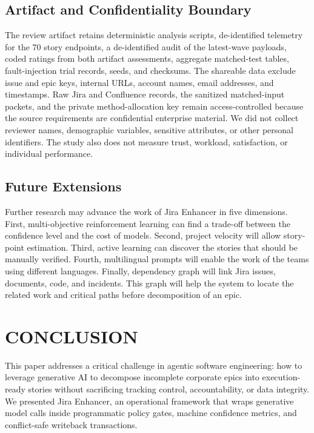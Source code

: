 \documentclass[manuscript,review]{acmart}
\begin{document}
\subsection{Artifact and Confidentiality Boundary}\label{sec:artifact-access}

The review artifact retains deterministic analysis scripts, de-identified telemetry for the 70 story endpoints, a de-identified audit of the latest-wave payloads, coded ratings from both artifact assessments, aggregate matched-test tables, fault-injection trial records, seeds, and checksums. The shareable data exclude issue and epic keys, internal URLs, account names, email addresses, and timestamps. Raw Jira and Confluence records, the sanitized matched-input packets, and the private method-allocation key remain access-controlled because the source requirements are confidential enterprise material. We did not collect reviewer names, demographic variables, sensitive attributes, or other personal identifiers. The study also does not measure trust, workload, satisfaction, or individual performance.

\subsection{Future Extensions}

Further research may advance the work of Jira Enhancer in five dimensions. First, multi-objective reinforcement learning can find a trade-off between the confidence level and the cost of models. Second, project velocity will allow story-point estimation. Third, active learning can discover the stories that should be manually verified. Fourth, multilingual prompts will enable the work of the teams using different languages. Finally, dependency graph will link Jira issues, documents, code, and incidents. This graph will help the system to locate the related work and critical paths before decomposition of an epic.

\section{CONCLUSION}\label{sec:conclusion}
This paper addresses a critical challenge in agentic software engineering: how to leverage generative AI to decompose incomplete corporate epics into execution-ready stories without sacrificing tracking control, accountability, or data integrity. We presented Jira Enhancer, an operational framework that wraps generative model calls inside programmatic policy gates, machine confidence metrics, and conflict-safe writeback transactions.
\end{document}

